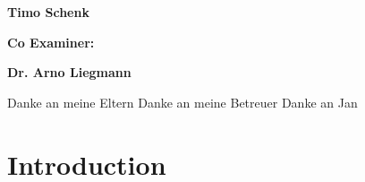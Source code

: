 \documentclass[11pt]{report}
\begin{document}
\begin{titlepage}
{\begin{minipage}[t]{0.47\textwidth}
            \end{minipage}
            \hfill
            \begin{minipage}[t]{0.47\textwidth}
                \raggedleft
                \large \textbf {Timo Schenk}\\
            \end{minipage}
            \begin{minipage}[t]{0.47\textwidth}
                \large \textbf {Co Examiner:}\\
            \end{minipage}
            \hfill
            \begin{minipage}[t]{0.47\textwidth}
                \raggedleft
                \large \textbf {Dr. Arno Liegmann}\\
            \end{minipage}
            \vfill
        }
        \clearpage
        \restoregeometry
    \end{titlepage}
    Danke an meine Eltern
    Danke an meine Betreuer %
    Danke an Jan
    \newpage
    \setcounter{page}{3}
    \tableofcontents


    \chapter{Introduction}\label{ch:introduction}
\end{document}
